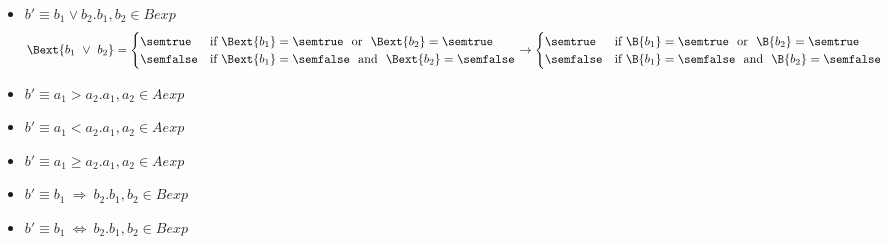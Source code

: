 \begin{enumerate}[label=(\alph*)]
\begin{itemize}
    \item $ b' \equiv b_1 \lor b_2. b_1, b_2 \in Bexp$ \\
      \begin{align*}  
        \Bext{b_1 \ \lor \ b_2} = 
        \begin{cases} 
        \semtrue & 
        \mbox{if} \ \Bext{b_1} = \semtrue \ \mbox{ or } \ 
              \Bext{b_2} = \semtrue \\ 
        \semfalse & 
        \mbox{if} \ \Bext{b_1} = \semfalse \ \mbox{ and } \ 
              \Bext{b_2} = \semfalse \\ 
        \end{cases} 
        \rightarrow
        \begin{cases} 
        \semtrue & 
        \mbox{if} \ \B{b_1} = \semtrue \ \mbox{ or } \ 
              \B{b_2} = \semtrue \\ 
        \semfalse & 
        \mbox{if} \ \B{b_1} = \semfalse \ \mbox{ and } \ 
              \B{b_2} = \semfalse \\ 
        \end{cases}
      \end{align*}
    \item $ b' \equiv a_1 > a_2. a_1, a_2 \in Aexp$ \\

    \item $ b' \equiv a_1 < a_2. a_1, a_2 \in Aexp$ \\

    \item $ b' \equiv a_1 \geq a_2. a_1, a_2 \in Aexp $ \\

    \item $ b' \equiv b_1 \ \Rightarrow \ b_2. b_1, b_2 \in Bexp $ \\

    \item $ b' \equiv b_1 \ \Leftrightarrow \ b_2. b_1, b_2 \in Bexp $ \\ 

  \end{itemize}
\end{enumerate}


